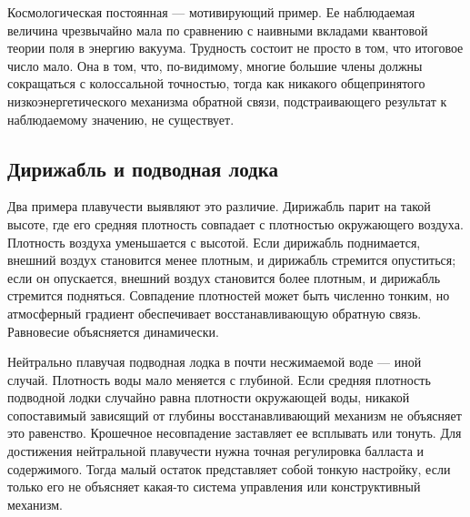 \begin{classroomqa}
\end{classroomqa}

Космологическая постоянная — мотивирующий пример. Ее наблюдаемая величина чрезвычайно мала по сравнению с наивными вкладами квантовой теории поля в энергию вакуума. Трудность состоит не просто в том, что итоговое число мало. Она в том, что, по-видимому, многие большие члены должны сокращаться с колоссальной точностью, тогда как никакого общепринятого низкоэнергетического механизма обратной связи, подстраивающего результат к наблюдаемому значению, не существует.

\subsection{Дирижабль и подводная лодка}

Два примера плавучести выявляют это различие. Дирижабль парит на такой высоте, где его средняя плотность совпадает с плотностью окружающего воздуха. Плотность воздуха уменьшается с высотой. Если дирижабль поднимается, внешний воздух становится менее плотным, и дирижабль стремится опуститься; если он опускается, внешний воздух становится более плотным, и дирижабль стремится подняться. Совпадение плотностей может быть численно тонким, но атмосферный градиент обеспечивает восстанавливающую обратную связь. Равновесие объясняется динамически.

Нейтрально плавучая подводная лодка в почти несжимаемой воде — иной случай. Плотность воды мало меняется с глубиной. Если средняя плотность подводной лодки случайно равна плотности окружающей воды, никакой сопоставимый зависящий от глубины восстанавливающий механизм не объясняет это равенство. Крошечное несовпадение заставляет ее всплывать или тонуть. Для достижения нейтральной плавучести нужна точная регулировка балласта и содержимого. Тогда малый остаток представляет собой тонкую настройку, если только его не объясняет какая-то система управления или конструктивный механизм.

